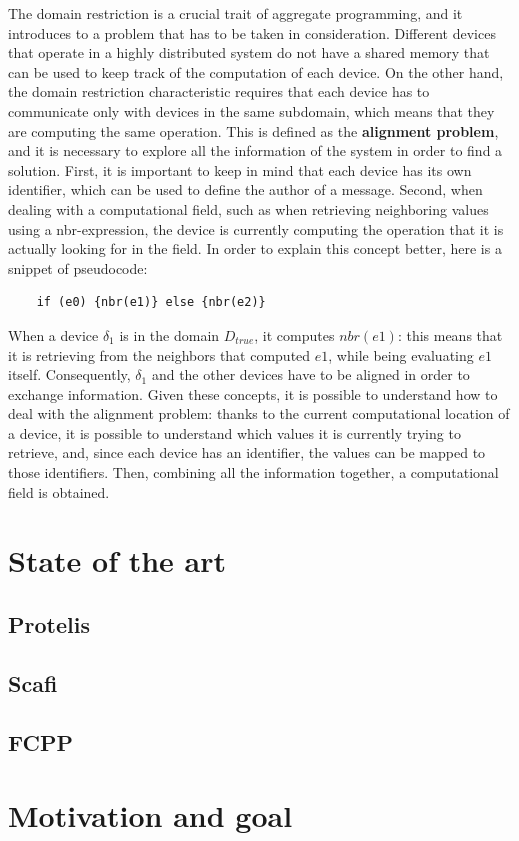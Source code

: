 The domain restriction is a crucial trait of aggregate programming, and it introduces to a problem that has to be taken in consideration. Different devices that operate in a highly distributed system do not have a shared memory that can be used to keep track of the computation of each device. On the other hand, the domain restriction characteristic requires that each device has to communicate only with devices in the same subdomain, which means that they are computing the same operation.\newline
This is defined as the \textbf{alignment problem}, and it is necessary to explore all the information of the system in order to find a solution. First, it is important to keep in mind that each device has its own identifier, which can be used to define the author of a message. Second, when dealing with a computational field, such as when retrieving neighboring values using a nbr-expression, the device is currently computing the operation that it is actually looking for in the field.\newline
In order to explain this concept better, here is a snippet of pseudocode:
\begin{lstlisting}
    if (e0) {nbr(e1)} else {nbr(e2)}
\end{lstlisting}
When a device $\delta_1$ is in the domain $D_{true}$, it computes $nbr(e1)$: this means that it is retrieving from the neighbors that computed $e1$, while being evaluating $e1$ itself.\newline
Consequently, $\delta_1$ and the other devices have to be aligned in order to exchange information.\newline
Given these concepts, it is possible to understand how to deal with the alignment problem: thanks to the current computational location of a device, it is possible to understand which values it is currently trying to retrieve, and, since each device has an identifier, the values can be mapped to those identifiers. Then, combining all the information together, a computational field is obtained.

\section{State of the art}
\subsection{Protelis}
\subsection{Scafi}
\subsection{FCPP}

\section{Motivation and goal}